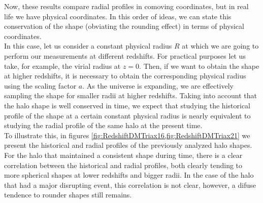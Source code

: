 Now, these results compare radial profiles in comoving coordinates, but in real life we have physical coordinates. In this order of ideas, we can state this conservation of the shape (obviating the rounding effect) in terms of physical coordinates.\\

In this case, let us consider a constant physical radius $R$ at which we are going to perform our measurements at different redshifts. For practical purposes let us take, for example, the virial radius at $z=0$. Then, if we want to obtain the shape at higher redshifts, it is necessary to obtain the corresponding physical radius using the scaling factor $a$. As the universe is expanding, we are effectively sampling the shape for smaller radii at higher redshifts. Taking into account that the halo shape is well conserved in time, we expect that studying the historical profile of the shape at a certain constant physical radius is nearly equivalent to studying the radial profile of the same halo at the present time. \\

To illustrate this, in figures \ref{fig:RedshiftDMTriax16,fig:RedshiftDMTriax21} we present the historical and radial profiles of the previously analyzed halo shapes. For the halo that maintained a consistent shape during time, there is a clear correlation between the historical and radial profiles, both clearly tending to more spherical shapes at lower redshifts and bigger radii. In the case of the halo that had a major disrupting event, this correlation is not clear, however, a difuse tendence to rounder shapes still remains.\\  

